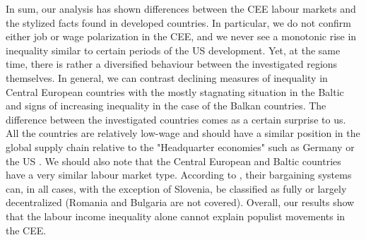 \documentclass[11pt]{article}
\begin{document}




In sum, our analysis has shown differences between the CEE labour markets and the stylized facts found in developed countries. In particular, we do not confirm either job or wage polarization in the CEE, and we never see a monotonic rise in inequality similar to certain periods of the US development. Yet, at the same time, there is rather a diversified behaviour between the investigated regions themselves. In general, we can contrast declining measures of inequality in Central European countries with the mostly stagnating situation in the Baltic and signs of increasing inequality in the case of the Balkan countries.
The difference between the investigated countries comes as a certain surprise to us. All the countries are relatively low-wage and should have a similar position in the global supply chain relative to the "Headquarter economies" such as Germany or the US \citep{baldwin2015supply}. We should also note that the Central European and Baltic countries have a very similar labour market type. According to \citet{/content/publication/1fd2da34-en}, their bargaining systems can, in all cases, with the exception of Slovenia, be classified as fully or largely decentralized (Romania and Bulgaria are not covered). Overall, our results show that the labour income inequality alone cannot explain populist movements in the CEE.
\end{document}
